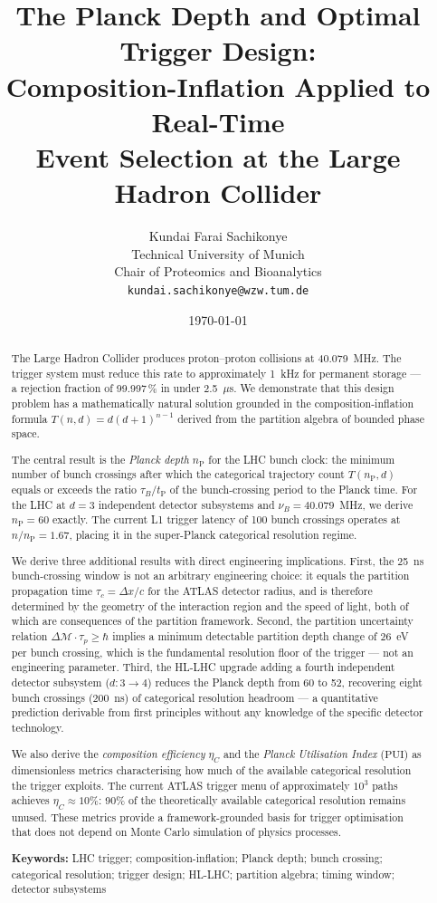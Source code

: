 \documentclass[twocolumn,10pt,a4paper]{article}
\title{\textbf{The Planck Depth and Optimal Trigger Design:\\
Composition-Inflation Applied to Real-Time\\
Event Selection at the Large Hadron Collider}}
\author{
Kundai Farai Sachikonye\\
Technical University of Munich\\
Chair of Proteomics and Bioanalytics\\
\texttt{kundai.sachikonye@wzw.tum.de}
}
\date{\today}
\theoremstyle{thmstyle}
\theoremstyle{definition}
\theoremstyle{remark}
\newcommand{\tP}{t_{\mathrm{P}}}
\newcommand{\nP}{n_{\mathrm{P}}}
\newcommand{\etaC}{\eta_{C}}
\newcommand{\PUI}{\mathrm{PUI}}
\begin{document}
\maketitle

\begin{abstract}
\noindent
The Large Hadron Collider produces proton--proton collisions at 40.079~MHz.
The trigger system must reduce this rate to approximately 1~kHz for permanent
storage — a rejection fraction of 99.997\,\% in under 2.5~$\mu$s.
We demonstrate that this design problem has a mathematically natural solution
grounded in the composition-inflation formula
$T(n,d) = d(d+1)^{n-1}$ derived from the partition algebra of bounded
phase space.

The central result is the \emph{Planck depth} $\nP$ for the LHC bunch clock:
the minimum number of bunch crossings after which the categorical trajectory
count $T(\nP, d)$ equals or exceeds the ratio $\tau_B/\tP$ of the
bunch-crossing period to the Planck time.
For the LHC at $d = 3$ independent detector subsystems and
$\nu_B = 40.079$~MHz, we derive $\nP = 60$ exactly.
The current L1 trigger latency of 100 bunch crossings operates at
$n/\nP = 1.67$, placing it in the super-Planck categorical resolution regime.

We derive three additional results with direct engineering implications.
First, the 25~ns bunch-crossing window is not an arbitrary engineering choice:
it equals the partition propagation time $\tau_c = \Delta x/c$ for the
ATLAS detector radius, and is therefore determined by the geometry of the
interaction region and the speed of light, both of which are consequences
of the partition framework. Second, the partition uncertainty relation
$\Delta\mathcal{M} \cdot \tau_p \geq \hbar$ implies a minimum detectable
partition depth change of 26~eV per bunch crossing, which is the fundamental
resolution floor of the trigger — not an engineering parameter.
Third, the HL-LHC upgrade adding a fourth independent detector subsystem
($d : 3 \to 4$) reduces the Planck depth from 60 to 52, recovering eight
bunch crossings (200~ns) of categorical resolution headroom — a quantitative
prediction derivable from first principles without any knowledge of the
specific detector technology.

We also derive the \emph{composition efficiency} $\etaC$ and the
\emph{Planck Utilisation Index} ($\PUI$) as dimensionless metrics
characterising how much of the available categorical resolution the trigger
exploits. The current ATLAS trigger menu of approximately $10^3$ paths
achieves $\etaC \approx 10\%$: 90\% of the theoretically available
categorical resolution remains unused. These metrics provide a framework-grounded
basis for trigger optimisation that does not depend on Monte Carlo simulation
of physics processes.

\medskip
\noindent\textbf{Keywords:} LHC trigger; composition-inflation; Planck depth;
bunch crossing; categorical resolution; trigger design; HL-LHC; partition
algebra; timing window; detector subsystems
\end{abstract}
\end{document}
